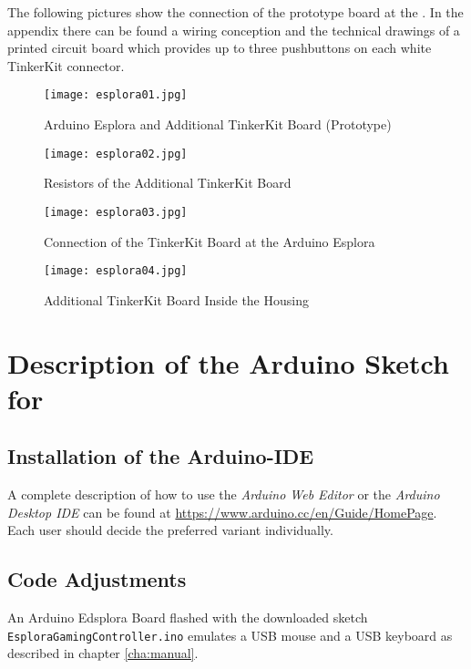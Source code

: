 The following pictures show the connection of the prototype board at the
\Bezeichnung. In the appendix there can be found a wiring conception and
the technical drawings of a printed circuit board which provides up to
three pushbuttons on each white TinkerKit connector.
 
\begin{figure}[!h]
\centering
\texttt{[image: esplora01.jpg]}
\caption{Arduino Esplora and Additional TinkerKit Board (Prototype)}
\label{fig:esplora01}
\end{figure}

\begin{figure}[!h]
\centering
\texttt{[image: esplora02.jpg]}
\caption{Resistors of the Additional TinkerKit Board}
\label{fig:esplora02}
\end{figure}

\newpage
\begin{figure}[!h]
\centering
\texttt{[image: esplora03.jpg]}
\caption{Connection of the TinkerKit Board at the Arduino Esplora}
\label{fig:esplora03}
\end{figure}

\begin{figure}[!h]
\centering
\texttt{[image: esplora04.jpg]}
\caption{Additional TinkerKit Board Inside the Housing}
\label{fig:esplora04}
\end{figure}



\newpage
\section{Description of the Arduino Sketch for \Bezeichnung}
\subsection{Installation of the Arduino-IDE}
A complete description of how to use the \textit{Arduino Web Editor} or
the \textit{Arduino Desktop IDE} can be found at
\url{https://www.arduino.cc/en/Guide/HomePage}. Each user should decide
the preferred variant individually.

\subsection{Code Adjustments}
An Arduino Edsplora Board flashed with the downloaded sketch
\texttt{EsploraGamingController.ino} emulates a USB mouse and a USB
keyboard as described in chapter \ref{cha:manual}.

